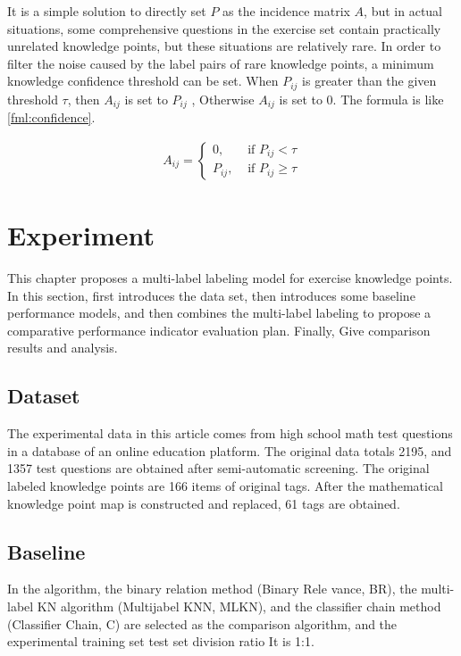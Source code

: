 It is a simple solution to directly set $P$ as the incidence matrix $A$, but in actual situations, some comprehensive questions in the exercise set contain practically unrelated knowledge points, but these situations are relatively rare. In order to filter the noise caused by the label pairs of rare knowledge points, a minimum knowledge confidence threshold can be set. When $P_{ij}$ is greater than the given threshold \(\tau\), then \(A_{ij}\) is set to $P_{ij}$ , Otherwise $A_{ij}$ is set to 0. The formula is like \ref{fml:confidence}.

\begin{align}
	A_{i j}=\left\{\begin{array}{ll}
		0,      & \text { if } P_{i j}<\tau      \\
		P_{ij}, & \text { if } P_{i j} \geq \tau
	\end{array}\right.\label{fml:confidence}
\end{align}

\section{Experiment}
This chapter proposes a multi-label labeling model for exercise knowledge points. In this section, first introduces the data set, then introduces some baseline performance models, and then combines the multi-label labeling to propose a comparative performance indicator evaluation plan. Finally, Give comparison results and analysis.
\subsection{Dataset}
The experimental data in this article comes from high school math test questions in a database of an online education platform. The original data totals 2195, and 1357 test questions are obtained after semi-automatic screening. The original labeled knowledge points are 166 items of original tags. After the mathematical knowledge point map is constructed and replaced, 61 tags are obtained.

\subsection{Baseline}
In the algorithm, the binary relation method (Binary Rele vance, BR), the multi-label KN algorithm (Multijabel KNN, MLKN), and the classifier chain method (Classifier Chain, C) are selected as the comparison algorithm, and the experimental training set test set division ratio It is 1:1.

